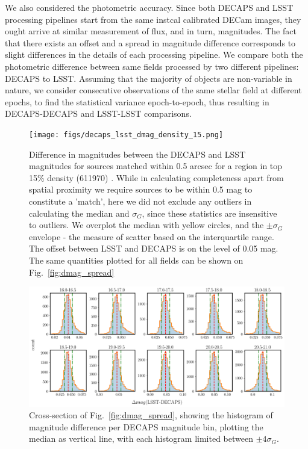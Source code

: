 \documentclass[DM,lsstdraft,toc,usenatbib]{lsstdoc}
\begin{document}
We also considered the photometric accuracy. Since both DECAPS and LSST processing pipelines start from the same instcal calibrated DECam images, they ought arrive at similar measurement of flux, and in turn, magnitudes.  The fact that there exists an offset and a spread in magnitude difference corresponds to slight differences in the details of each processing pipeline. We compare both the photometric difference between same fields processed by two different pipelines: DECAPS to LSST. Assuming that the majority of objects are non-variable in nature, we consider consecutive observations of the same stellar field at different epochs, to find the statistical variance epoch-to-epoch, thus resulting in DECAPS-DECAPS and LSST-LSST comparisons.

\begin{figure}
\begin{centering}
\texttt{[image: figs/decaps\_lsst\_dmag\_density\_15.png]}
\caption{Difference in magnitudes between the DECAPS and LSST magnitudes for sources matched within 0.5 arcsec for a region in top 15\% density (611970) . While in calculating completeness apart from spatial proximity we require sources to be within 0.5 mag to constitute a 'match', here we did not exclude any outliers in calculating the median and $\sigma_{G}$, since these statistics are insensitive to outliers.  We overplot the median with yellow circles, and the $\pm \sigma_{G}$ envelope - the measure of scatter based on the interquartile range. The offset between LSST and DECAPS is on the level of 0.05 mag. The same quantities plotted for all fields can be shown on Fig.~\ref{fig:dmag_spread} }
\label{fig:dmag_scatter}
\end{centering}
\end{figure} 

\begin{figure}
\includegraphics[width=1.0\columnwidth]{figs/rms_decaps_lsst_611970hist_panel.png}
\caption{Cross-section of Fig.~\ref{fig:dmag_spread}, showing the histogram of magnitude difference per DECAPS magnitude bin, plotting the median as vertical line, with each histogram limited between $\pm 4 \sigma_{G}$. }
\label{fig:dmag_hist}
\end{figure} 
\end{document}
